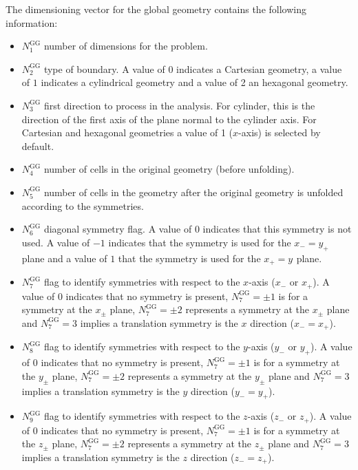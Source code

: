 The dimensioning vector for the global geometry contains the following information:
\begin{itemize}
\item $N^{\text{GG}}_{1}$ number of dimensions for the problem.
\item $N^{\text{GG}}_{2}$ type of boundary. A value of $0$ indicates a Cartesian geometry, a value of $1$ indicates a cylindrical geometry and a value of 2 an hexagonal geometry. 
\item $N^{\text{GG}}_{3}$ first direction to process in the analysis. For cylinder, this is the direction of the first axis of the plane normal to the cylinder axis. For Cartesian and hexagonal geometries a value of 1 ($x$-axis) is selected by default. 
\item $N^{\text{GG}}_{4}$ number of cells in the original geometry (before unfolding).
\item $N^{\text{GG}}_{5}$ number of cells in the geometry after the original geometry is unfolded according to the symmetries.
\item $N^{\text{GG}}_{6}$ diagonal symmetry flag. A value of $0$ indicates that this symmetry is not used. A value of $-1$ indicates that the symmetry is used for the $x_{-}=y_{+}$ plane and a value of $1$ that the symmetry is used for the $x_{+}=y_{}$ plane.
\item $N^{\text{GG}}_{7}$ flag to identify symmetries with respect to the $x$-axis ($x_{-}$ or $x_{+}$). A value of $0$ indicates that no symmetry is present, $N^{\text{GG}}_{7}=\pm 1$ is for a  symmetry at the $x_{\pm}$ plane, $N^{\text{GG}}_{7}=\pm 2$ represents a  symmetry at the $x_{\pm}$ plane and $N^{\text{GG}}_{7}= 3$ implies a translation symmetry is the $x$ direction ($x_{-}=x_{+}$).
\item $N^{\text{GG}}_{8}$ flag to identify symmetries with respect to the $y$-axis ($y_{-}$ or $y_{+}$). A value of $0$ indicates that no symmetry is present, $N^{\text{GG}}_{7}=\pm 1$ is for a  symmetry at the $y_{\pm}$ plane, $N^{\text{GG}}_{7}=\pm 2$ represents a  symmetry at the $y_{\pm}$ plane and $N^{\text{GG}}_{7}= 3$ implies a translation symmetry is the $y$ direction ($y_{-}=y_{+}$).
\item $N^{\text{GG}}_{9}$ flag to identify symmetries with respect to the $z$-axis ($z_{-}$ or $z_{+}$). A value of $0$ indicates that no symmetry is present, $N^{\text{GG}}_{7}=\pm 1$ is for a  symmetry at the $z_{\pm}$ plane, $N^{\text{GG}}_{7}=\pm 2$ represents a  symmetry at the $z_{\pm}$ plane and $N^{\text{GG}}_{7}= 3$ implies a translation symmetry is the $z$ direction ($z_{-}=z_{+}$).

\end{itemize}
